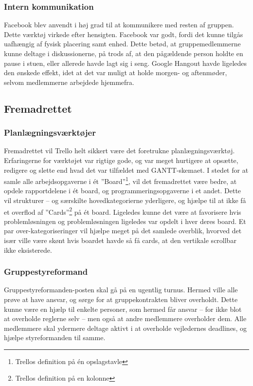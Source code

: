 \subsubsection{Intern kommunikation}
Facebook blev anvendt i høj grad til at kommunikere med resten af gruppen. Dette værktøj virkede efter hensigten. Facebook var godt, fordi det kunne tilgås uafhængig af fysisk placering samt enhed. Dette betød, at gruppemedlemmerne kunne deltage i diskussionerne, på trods af, at den pågældende person holdte en pause i stuen, eller allerede havde lagt sig i seng. Google Hangout havde ligeledes den ønskede effekt, idet at det var muligt at holde morgen- og aftenmøder, selvom medlemmerne arbejdede hjemmefra.

\subsection{Fremadrettet} 
\subsubsection{Planlægningsværktøjer}
Fremadrettet vil Trello helt sikkert være det foretrukne planlægningsværktøj. Erfaringerne for værktøjet var rigtige gode, og var meget hurtigere at opsætte, redigere og slette end hvad det var tilfældet med GANTT-skemaet. I stedet for at samle alle arbejdsopgaverne i ét ”Board”\footnote{Trellos definition på én opslagstavle}, vil det fremadrettet være bedre, at opdele rapportdelene i ét board, og programmeringsopgaverne i et andet. Dette vil strukturer – og særskilte hovedkategorierne yderligere, og hjælpe til at ikke få et overflod af ”Cards”\footnote{Trellos definition på en kolonne} på ét board. Ligeledes kunne det være at favorisere hvis problemløsningen og problemløsningen ligeledes var opdelt i hver deres board. Et par over-kategoriseringer vil hjælpe meget på det samlede overblik, hvorved det især ville være skønt hvis boardet havde så få cards, at den vertikale scrollbar ikke eksisterede. \\ 

\subsubsection{Gruppestyreformand} 
Gruppestyreformanden-posten skal gå på en ugentlig turnus. Hermed ville alle prøve at have ansvar, og sørge for at gruppekontrakten bliver overholdt. Dette kunne være en hjælp til enkelte personer, som hermed får ansvar – for ikke blot at overholde reglerne selv – men også at andre medlemmere overholder dem. Alle medlemmere skal ydermere deltage aktivt i at overholde vejledernes deadlines, og hjælpe styreformanden til samme. \\

